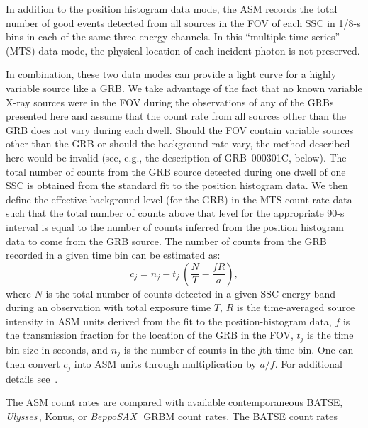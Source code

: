 \documentclass{aastex}
\def\sax{{\it BeppoSAX\,}}
\def\uly{{\it Ulysses\,}}
\begin{document}
In addition to the position histogram data mode, the ASM records the
total number of good events detected from all sources in the FOV of
each SSC in 1/8-s bins in each of the same three energy channels.  In
this ``multiple time series'' (MTS) data mode, the physical location
of each incident photon is not preserved.

In combination, these two data modes can provide a light curve for a
highly variable source like a GRB.  We take advantage of the fact that
no known variable X-ray sources were in the FOV during the
observations of any of the GRBs presented here and assume that the
count rate from all sources other than the GRB does not vary during
each dwell. Should the FOV contain variable sources other than the GRB
or should the background rate vary, the method described here would be
invalid (see, e.g., the description of GRB~000301C, below).  The total
number of counts from the GRB source detected during one dwell of one
SSC is obtained from the standard fit to the position histogram data.
We then define the effective background level (for the GRB) in the MTS
count rate data such that the total number of counts above that level
for the appropriate 90-s interval is equal to the number of counts
inferred from the position histogram data to come from the GRB source.
The number of counts from the GRB recorded in a given time bin can be
estimated as:
\begin{equation}
c_j = n_j - t_j\ \left(\frac{N}{T} - \frac{fR}{a}\right),
\label{eq:bgcounts}
\end{equation}
where $N$ is the total number of counts detected in a given SSC energy
band during an observation with total exposure time $T$, $R$ is the
time-averaged source intensity in ASM units derived from the fit to
the position-histogram data, $f$ is the transmission fraction for the
location of the GRB in the FOV, $t_j$ is the time bin size in seconds,
and $n_j$ is the number of counts in the $j$th time bin.  One can then
convert $c_j$ into ASM units through multiplication by $a/f$.  For
additional details see~\citet{smithe99}.

The ASM count rates are compared with available contemporaneous BATSE,
\uly, Konus, or \sax~GRBM count rates.  The BATSE count rates 
\end{document}
